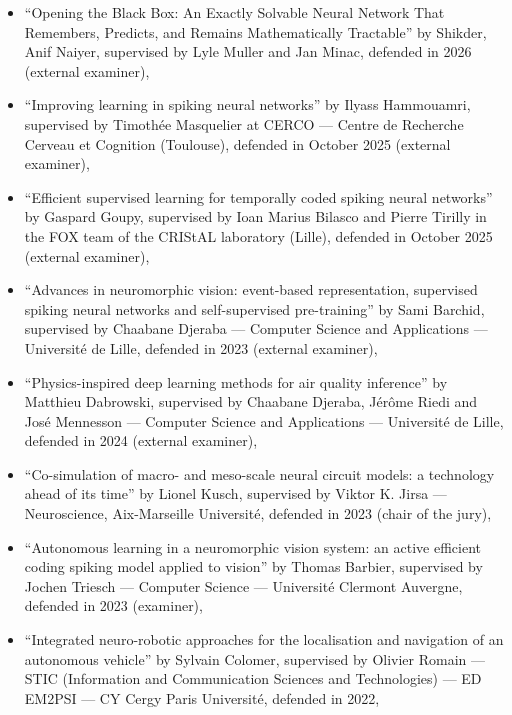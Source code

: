 \documentclass[10pt,english,a4paper,oneside]{article}%
\begin{document}
\begin{itemize}
	\item ``Opening the Black Box: An Exactly Solvable Neural Network That Remembers, Predicts, and Remains Mathematically Tractable'' by Shikder, Anif Naiyer, supervised by Lyle Muller and Jan Minac, defended in 2026 (external examiner),

	\item ``Improving learning in spiking neural networks'' by Ilyass Hammouamri, supervised by Timothée Masquelier at CERCO --- Centre de Recherche Cerveau et Cognition (Toulouse), defended in October 2025 (external examiner),

	\item ``Efficient supervised learning for temporally coded spiking neural networks'' by Gaspard Goupy, supervised by Ioan Marius Bilasco and Pierre Tirilly in the FOX team of the CRIStAL laboratory (Lille), defended in October 2025 (external examiner),

	\item ``Advances in neuromorphic vision: event-based representation, supervised spiking neural networks and self-supervised pre-training'' by Sami Barchid, supervised by Chaabane Djeraba --- Computer Science and Applications --- Université de Lille, defended in 2023 (external examiner),

	\item ``Physics-inspired deep learning methods for air quality inference'' by Matthieu Dabrowski, supervised by Chaabane Djeraba, Jérôme Riedi and José Mennesson --- Computer Science and Applications --- Université de Lille, defended in 2024 (external examiner),

    \item ``Co-simulation of macro- and meso-scale neural circuit models: a technology ahead of its time'' by Lionel Kusch, supervised by Viktor K. Jirsa --- Neuroscience, Aix-Marseille Université, defended in 2023 (chair of the jury),

    \item ``Autonomous learning in a neuromorphic vision system: an active efficient coding spiking model applied to vision'' by Thomas Barbier, supervised by Jochen Triesch --- Computer Science --- Université Clermont Auvergne, defended in 2023  (examiner),

    \item ``Integrated neuro-robotic approaches for the localisation and navigation of an autonomous vehicle'' by Sylvain Colomer, supervised by Olivier Romain --- STIC (Information and Communication Sciences and Technologies) --- ED EM2PSI --- CY Cergy Paris Université, defended in 2022,


\end{itemize}
\end{document}
